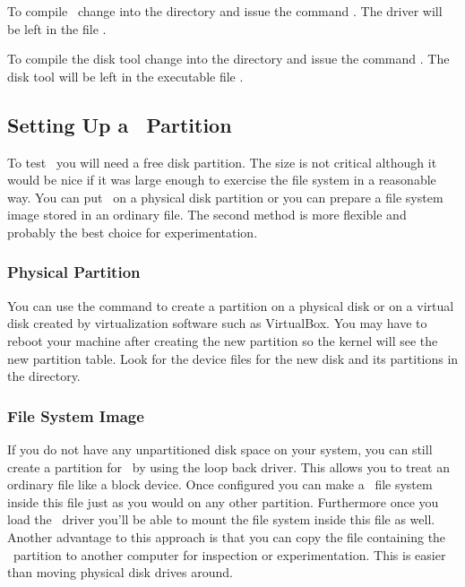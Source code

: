 To compile \GenericFS\ change into the  directory and issue the command
. The driver will be left in the file .

To compile the disk tool change into the  directory and issue the command
. The disk tool will be left in the executable file .

\subsection{Setting Up a \GenericFS\ Partition}
\label{sec:partition}

To test \GenericFS\ you will need a free disk partition. The size is not critical although it
would be nice if it was large enough to exercise the file system in a reasonable way. You can
put \GenericFS\ on a physical disk partition or you can prepare a file system image stored in an
ordinary file. The second method is more flexible and probably the best choice for
experimentation.

\subsubsection{Physical Partition}

You can use the  command to create a partition on a physical disk or on a virtual
disk created by virtualization software such as VirtualBox. You may have to reboot your machine
after creating the new partition so the kernel will see the new partition table. Look for the
device files for the new disk and its partitions in the  directory.


\subsubsection{File System Image}

If you do not have any unpartitioned disk space on your system, you can still create a partition
for \GenericFS\ by using the loop back driver. This allows you to treat an ordinary file like a
block device. Once configured you can make a \GenericFS\ file system inside this file just as
you would on any other partition. Furthermore once you load the \GenericFS\ driver you'll be
able to mount the file system inside this file as well. Another advantage to this approach is
that you can copy the file containing the \GenericFS\ partition to another computer for
inspection or experimentation. This is easier than moving physical disk drives around.

